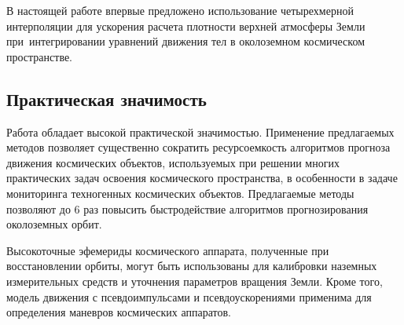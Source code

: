 В настоящей работе впервые предложено использование четырехмерной интерполяции для
ускорения расчета плотности верхней атмосферы Земли 
при интегрировании уравнений движения тел в околоземном космическом пространстве.

\subsection*{Практическая значимость}

Работа обладает высокой практической значимостью. 
Применение предлагаемых методов позволяет существенно сократить ресурсоемкость алгоритмов 
прогноза движения космических объектов, используемых при решении 
многих практических задач освоения космического пространства, в особенности в задаче 
мониторинга техногенных космических объектов. Предлагаемые методы позволяют до 6 раз 
повысить быстродействие алгоритмов прогнозирования околоземных орбит.

Высокоточные эфемериды космического аппарата, полученные при восстановлении орбиты,
могут быть использованы для калибровки наземных измерительных средств и
уточнения параметров вращения Земли. 
Кроме того, модель движения с псевдоимпульсами и псевдоускорениями применима 
для определения маневров космических аппаратов.


\newpage
